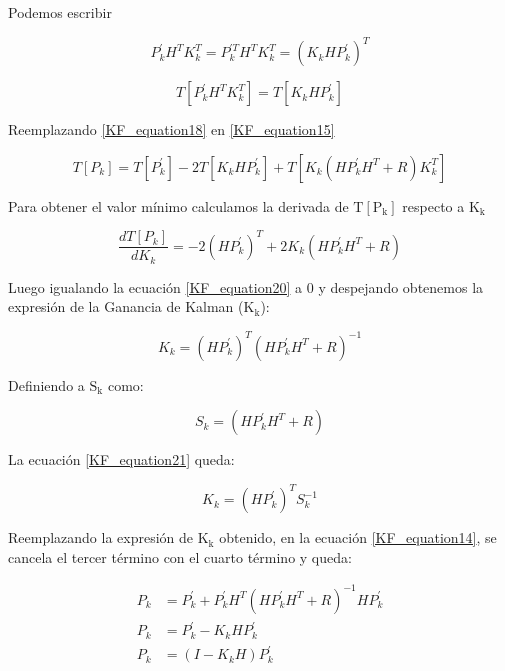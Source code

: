 \documentclass[10pt,a4paper]{article}
\begin{document}
\noindent Podemos escribir

\begin{equation}
    P^\prime_k H^T K^T_k = P^{\prime T}_k H^T K^T_k = (K_k H P^\prime_k )^T
    \label{KF_equation17}
\end{equation}	

\begin{equation}
    T[P^\prime_k H^T K^T_k] = T[K_k H P^\prime_k]
    \label{KF_equation18}
\end{equation}	

Reemplazando \ref{KF_equation18} en \ref{KF_equation15}

\begin{equation}
    T[P_k] = T[P^\prime_k] -2 T[K_k H P^\prime_k] + T[K_k (H P^\prime_k H^T + R) K^T_k]
    \label{KF_equation19}
\end{equation}	

\noindent Para obtener el valor mínimo calculamos la derivada de 
$\mathrm{T[P_k]}$ respecto a $\mathrm{K_k}$

\begin{equation}
    \frac{dT[P_k]}{dK_k} = -2 (H P^\prime_k)^T + 2K_k (H P^\prime_k H^T + R)
    \label{KF_equation20}
\end{equation}	

\noindent Luego igualando la ecuación \ref{KF_equation20} a 0 y despejando 
obtenemos la expresión de la Ganancia de Kalman ($\mathrm{K_k}$):

\begin{equation}
    K_k = (H P^\prime_k)^T (H P^\prime_k H^T + R)^{-1} 
    \label{KF_equation21}
\end{equation}	

\noindent Definiendo a $\mathrm{S_k}$ como:

\begin{equation}
    S_k = (H P^\prime_k H^T + R)
    \label{KF_equation22}
\end{equation}	

\noindent La ecuación \ref{KF_equation21} queda:

\begin{equation}
    K_k = (H P^\prime_k)^T S_k^{-1} 
    \label{K_Gain}
\end{equation}	

\noindent Reemplazando la expresión de $\mathrm{K_k}$ obtenido, en la 
ecuación  \ref{KF_equation14}, se cancela el tercer término con el cuarto 
término y queda:

\begin{align}
    P_k  &= P^\prime_k + P^\prime_k H^T (H P^\prime_k H^T + R)^{-1} H P^\prime_k \nonumber \\
    P_k  &= P^\prime_k - K_k H P^\prime_k \nonumber\\
    P_k  &= (I - K_k H) P^\prime_k	
    \label{KF_equation23}	
\end{align}
\end{document}
